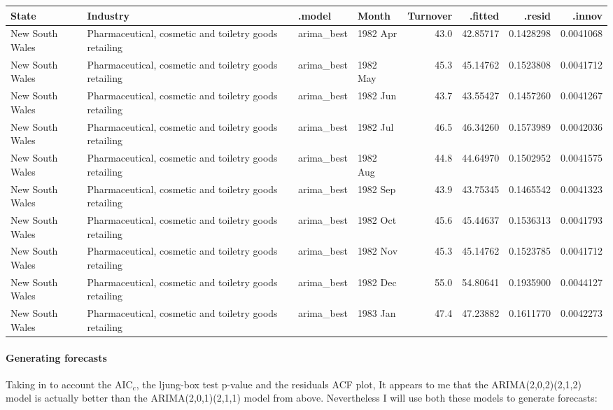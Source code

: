 \documentclass[
]{article}
\begin{document}
\begin{table}
\centering
\begin{tabular}[t]{l|l|l|l|r|r|r|r}
\hline
State & Industry & .model & Month & Turnover & .fitted & .resid & .innov\\
\hline
New South Wales & Pharmaceutical, cosmetic and toiletry goods retailing & arima\_best & 1982 Apr & 43.0 & 42.85717 & 0.1428298 & 0.0041068\\
\hline
New South Wales & Pharmaceutical, cosmetic and toiletry goods retailing & arima\_best & 1982 May & 45.3 & 45.14762 & 0.1523808 & 0.0041712\\
\hline
New South Wales & Pharmaceutical, cosmetic and toiletry goods retailing & arima\_best & 1982 Jun & 43.7 & 43.55427 & 0.1457260 & 0.0041267\\
\hline
New South Wales & Pharmaceutical, cosmetic and toiletry goods retailing & arima\_best & 1982 Jul & 46.5 & 46.34260 & 0.1573989 & 0.0042036\\
\hline
New South Wales & Pharmaceutical, cosmetic and toiletry goods retailing & arima\_best & 1982 Aug & 44.8 & 44.64970 & 0.1502952 & 0.0041575\\
\hline
New South Wales & Pharmaceutical, cosmetic and toiletry goods retailing & arima\_best & 1982 Sep & 43.9 & 43.75345 & 0.1465542 & 0.0041323\\
\hline
New South Wales & Pharmaceutical, cosmetic and toiletry goods retailing & arima\_best & 1982 Oct & 45.6 & 45.44637 & 0.1536313 & 0.0041793\\
\hline
New South Wales & Pharmaceutical, cosmetic and toiletry goods retailing & arima\_best & 1982 Nov & 45.3 & 45.14762 & 0.1523785 & 0.0041712\\
\hline
New South Wales & Pharmaceutical, cosmetic and toiletry goods retailing & arima\_best & 1982 Dec & 55.0 & 54.80641 & 0.1935900 & 0.0044127\\
\hline
New South Wales & Pharmaceutical, cosmetic and toiletry goods retailing & arima\_best & 1983 Jan & 47.4 & 47.23882 & 0.1611770 & 0.0042273\\
\hline
\end{tabular}
\end{table}

\hypertarget{generating-forecasts}{%
\paragraph{Generating forecasts}\label{generating-forecasts}}

Taking in to account the AIC\(_c\), the ljung-box test p-value and the
residuals ACF plot, It appears to me that the ARIMA(2,0,2)(2,1,2) model
is actually better than the ARIMA(2,0,1)(2,1,1) model from above.
Nevertheless I will use both these models to generate forecasts:
\end{document}

